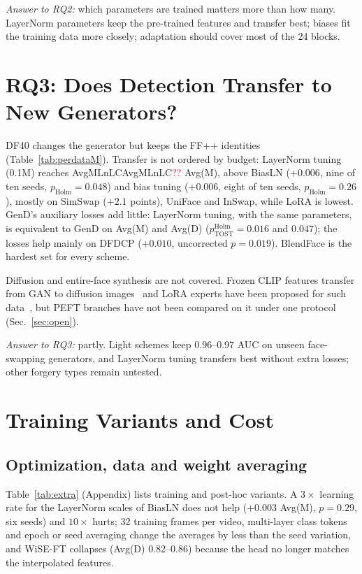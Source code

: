 \documentclass[fonts]{icst}
\newcommand{\num}[1]{\ifcsname #1\endcsname\csname #1\endcsname\else\textcolor{red}{??}\fi}
\begin{document}
\textit{Answer to RQ2:} which parameters are trained matters more than how many. LayerNorm parameters keep the pre-trained features and transfer best; biases fit the training data more closely; adaptation should cover most of the 24 blocks.

\section{RQ3: Does Detection Transfer to New Generators?}
\label{sec:rq3}


DF40 changes the generator but keeps the FF++ identities (Table~\ref{tab:perdataM}). Transfer is not ordered by budget: LayerNorm tuning (0.1M) reaches \num{AvgMLnLC} Avg(M), above BiasLN ($+0.006$, nine of ten seeds, $p_{\mathrm{Holm}}=0.048$) and bias tuning ($+0.006$, eight of ten seeds, $p_{\mathrm{Holm}}=0.26$), mostly on SimSwap ($+2.1$ points), UniFace and InSwap, while LoRA is lowest. GenD's auxiliary losses add little: LayerNorm tuning, with the same parameters, is equivalent to GenD on Avg(M) and Avg(D) ($p^{\mathrm{Holm}}_{\mathrm{TOST}}=0.016$ and $0.047$); the losses help mainly on DFDCP ($+0.010$, uncorrected $p=0.019$). BlendFace is the hardest set for every scheme.

Diffusion and entire-face synthesis are not covered. Frozen CLIP features transfer from GAN to diffusion images~\cite{ojha2023universal} and LoRA experts have been proposed for such data~\cite{liu2024mole}, but PEFT branches have not been compared on it under one protocol (Sec.~\ref{sec:open}).

\textit{Answer to RQ3:} partly. Light schemes keep 0.96--0.97 AUC on unseen face-swapping generators, and LayerNorm tuning transfers best without extra losses; other forgery types remain untested.

\section{Training Variants and Cost}

\subsection{Optimization, data and weight averaging}
\label{sec:extra}
Table~\ref{tab:extra} (Appendix) lists training and post-hoc variants. A $3\times$ learning rate for the LayerNorm scales of BiasLN does not help ($+0.003$ Avg(M), $p=0.29$, six seeds) and $10\times$ hurts; 32 training frames per video, multi-layer class tokens and epoch or seed averaging change the averages by less than the seed variation, and WiSE-FT collapses (Avg(D) 0.82--0.86) because the head no longer matches the interpolated features.
\end{document}
